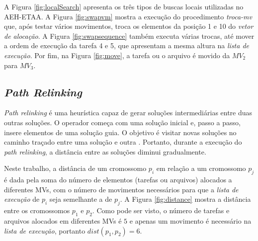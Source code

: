 


A Figura \ref{fig:localSearch} apresenta os três tipos de buscas locais utilizadas no AEH-ETAA. A Figura \ref{fig:swapvm} mostra a execução do procedimento \textit{troca-mv} que, após testar vários movimentos, troca os elementos da posição 1 e 10 do \textit{vetor de alocação}. A Figura \ref{fig:swapsequence} também executa várias trocas, até mover a ordem de execução da tarefa 4 e 5, que apresentam a mesma altura na \textit{lista de execução}. Por fim, na Figura \ref{fig:move}, a tarefa ou o arquivo é movido da $MV_2$ para $MV_3$.

\subsection{\textit{Path Relinking}}\label{ssec:pr}

\textit{Path relinking} é uma heurística capaz de gerar soluções intermediárias entre duas outras soluções. O operador começa com uma solução inicial e, passo a passo, insere elementos de uma solução guia. O objetivo é visitar novas soluções no caminho traçado entre uma solução e outra \cite{Glover2000}. Portanto, durante a execução do \textit{path relinking}, a distância entre as soluções diminui gradualmente.


Neste trabalho, a distância de um cromossomo $p_i$ em relação a um cromossomo $p_j$ é dada pela soma do número de elementos (tarefas ou arquivos) alocados a diferentes MVs, com o número de movimentos necessários para que a \textit{lista de execução} de $p_i$ seja semelhante a de $p_j$. A Figura \ref{fig:distance} mostra a distância entre os cromossomos $p_1$ e $p_2$. Como pode ser visto, o número de tarefas e arquivos alocados em diferentes MVs é $5$ e apenas um movimento é necessário na \textit{lista de execução}, portanto $dist(p_1, p_2) = 6$.


